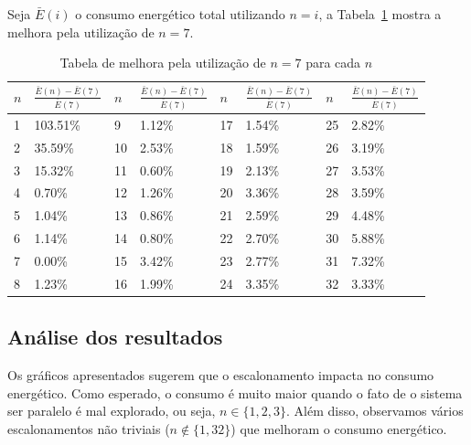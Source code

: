 Seja $ \bar{E}(i) $ o consumo energético total utilizando $ n = i $, a Tabela~\ref{agend_proc_energy_impact} mostra a melhora pela utilização de $ n = 7 $.

\begin{table}[h]
\centering
\begin{tabular}{ll|ll|ll|ll}
$ n $ & \textbf{$ \frac{\bar{E}(n) - \bar{E}(7)}{\bar{E}(7)} $} & $ n $ & \textbf{$ \frac{\bar{E}(n) - \bar{E}(7)}{\bar{E}(7)} $} & $ n $ & \textbf{$ \frac{\bar{E}(n) - \bar{E}(7)}{\bar{E}(7)} $} & $ n $ & \textbf{$ \frac{\bar{E}(n) - \bar{E}(7)}{\bar{E}(7)} $} \\ \hline
1     & 103.51\%         & 9     & 1.12\%           & 17    & 1.54\%           & 25    & 2.82\%           \\
2     & 35.59\%          & 10    & 2.53\%           & 18    & 1.59\%           & 26    & 3.19\%           \\
3     & 15.32\%          & 11    & 0.60\%           & 19    & 2.13\%           & 27    & 3.53\%           \\
4     & 0.70\%           & 12    & 1.26\%           & 20    & 3.36\%           & 28    & 3.59\%           \\
5     & 1.04\%           & 13    & 0.86\%           & 21    & 2.59\%           & 29    & 4.48\%           \\
6     & 1.14\%           & 14    & 0.80\%           & 22    & 2.70\%           & 30    & 5.88\%           \\
7     & 0.00\%           & 15    & 3.42\%           & 23    & 2.77\%           & 31    & 7.32\%           \\
8     & 1.23\%           & 16    & 1.99\%           & 24    & 3.35\%           & 32    & 3.33\%
\end{tabular}
\caption{Tabela de melhora pela utilização de $ n = 7 $ para cada $ n $}
\label{agend_proc_energy_impact}
\end{table}\FloatBarrier

\subsection{Análise dos resultados}
Os gráficos apresentados sugerem que o escalonamento impacta no consumo energético. Como esperado, o consumo é muito maior quando o fato de o sistema ser paralelo é mal explorado, ou seja, $ n \in \{1,2,3\} $. Além disso, observamos vários escalonamentos não triviais ($ n \notin \{1, 32\} $) que melhoram o consumo energético.

